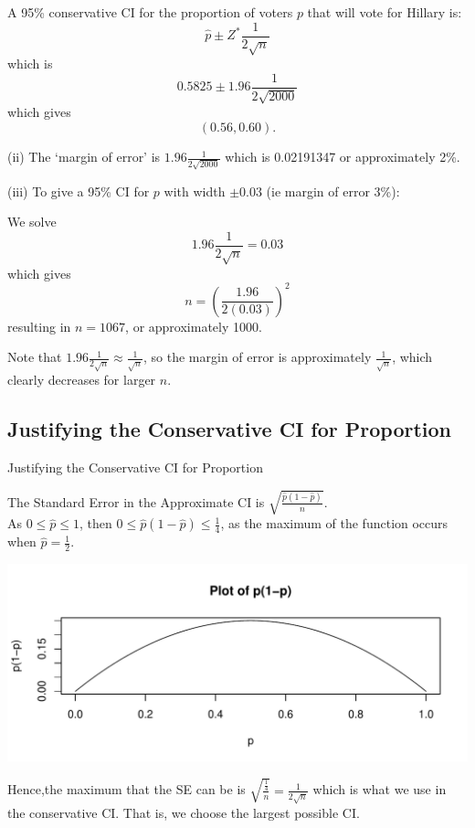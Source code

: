 \documentclass[t,xcolor=pdftex,dvipsnames,table]{beamer}
\makeatletter
\def\maxwidth{ %
  \ifdim\Gin@nat@width>\linewidth
    \linewidth
  \else
    \Gin@nat@width
  \fi
}
\newenvironment{knitrout}{}{} %
\makeatother
\begin{document}
\begin{frame}[fragile]{}

A 95\% conservative CI for the proportion of voters $p$ that will vote for Hillary is:
\[ \hat{p} \pm Z^{*} \frac{1}{2 \sqrt{n}} \]
which is
\[ 0.5825 \pm 1.96 \frac{1}{2 \sqrt{2000}} \]
which gives
\[ (0.56,0.60). \]

\vspace{.5cm}
(ii) The `margin of error' is $1.96 \frac{1}{2 \sqrt{2000}}$
which is 0.02191347 or approximately 2\%.

\end{frame}

\begin{frame}[fragile]{}

\vspace{.5cm}
(iii) To give a 95\% CI for $p$ with width $\pm 0.03$ (ie margin of error 3\%):

We solve \[ 1.96 \frac{1}{2 \sqrt{n}} = 0.03 \]
which gives
\[ n = (\frac{1.96}{2 (0.03)} )^2 \]
resulting in $n=1067$, or approximately 1000.

\vspace{.5cm}
Note that  $1.96 \frac{1}{2 \sqrt{n}} \approx \frac{1}{\sqrt{n}}$, so the margin of error is approximately $\frac{1}{\sqrt{n}}$, which clearly decreases for larger $n$.
\end{frame}




\subsection[Justifying the Conservative CI for Proportion]{Justifying the Conservative CI for Proportion}
\begin{frame}[fragile]{Justifying the Conservative CI for Proportion}

The Standard Error in the Approximate CI is $\sqrt{ \frac{\hat{p}(1- \hat{p})}{n} }$. \\

As $0 \leq \hat{p} \leq 1$, then
 $0 \leq \hat{p}(1- \hat{p}) \leq \frac{1}{4}$, as the maximum of the function occurs when $\hat{p} = \frac{1}{2}$.
 
\begin{knitrout}
\color{fgcolor}
\includegraphics[width=\maxwidth]{figure/unnamed-chunk-16-1} 

\end{knitrout}
 
Hence,the maximum that the SE can be is 
$\sqrt{ \frac{\frac{1}{4}}{n} } = \frac{1}{2 \sqrt{n}}$
which is what we use in the conservative CI. That is, we choose the largest possible CI.
\end{frame}
\end{document}
